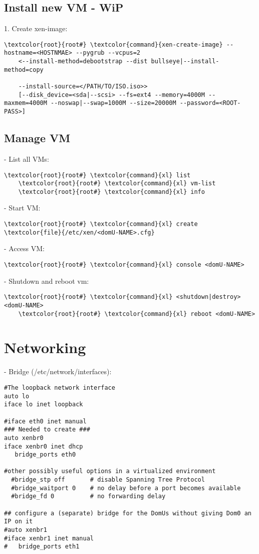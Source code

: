 \documentclass[10pt, a4paper, onecolumn, openany]{book} %
\begin{document}
\subsection{Install new VM - WiP}
1. Create xen-image:
\begin{Verbatim}[commandchars=\\\{\}]
    \textcolor{root}{root#} \textcolor{command}{xen-create-image} --hostname=<HOSTNMAE> --pygrub --vcpus=2 
    <--install-method=debootstrap --dist bullseye|--install-method=copy 
    
    --install-source=</PATH/TO/ISO.iso>>
    [--disk_device=<sda|--scsi> --fs=ext4 --memory=4000M --maxmem=4000M --noswap|--swap=1000M --size=20000M --password=<ROOT-PASS>] 
\end{Verbatim}
\subsection{Manage VM}
- List all VMs:
\begin{Verbatim}[commandchars=\\\{\}]
    \textcolor{root}{root#} \textcolor{command}{xl} list
    \textcolor{root}{root#} \textcolor{command}{xl} vm-list
    \textcolor{root}{root#} \textcolor{command}{xl} info
\end{Verbatim}
- Start VM:
\begin{Verbatim}[commandchars=\\\{\}]
    \textcolor{root}{root#} \textcolor{command}{xl} create \textcolor{file}{/etc/xen/<domU-NAME>.cfg}
\end{Verbatim}
- Access VM:
\begin{Verbatim}[commandchars=\\\{\}]
    \textcolor{root}{root#} \textcolor{command}{xl} console <domU-NAME>
\end{Verbatim}
- Shutdown and reboot vm:
\begin{Verbatim}[commandchars=\\\{\}]
    \textcolor{root}{root#} \textcolor{command}{xl} <shutdown|destroy> <domU-NAME>
    \textcolor{root}{root#} \textcolor{command}{xl} reboot <domU-NAME>
\end{Verbatim}


\section{Networking}
- Bridge (\textcolor{file}{/etc/network/interfaces}):
\begin{Verbatim}[commandchars=\\\{\}]
#The loopback network interface
auto lo
iface lo inet loopback

#iface eth0 inet manual
### Needed to create ###
auto xenbr0
iface xenbr0 inet dhcp
   bridge_ports eth0

#other possibly useful options in a virtualized environment
  #bridge_stp off       # disable Spanning Tree Protocol
  #bridge_waitport 0    # no delay before a port becomes available
  #bridge_fd 0          # no forwarding delay

## configure a (separate) bridge for the DomUs without giving Dom0 an IP on it
#auto xenbr1
#iface xenbr1 inet manual
#   bridge_ports eth1
\end{Verbatim}
\end{document}
